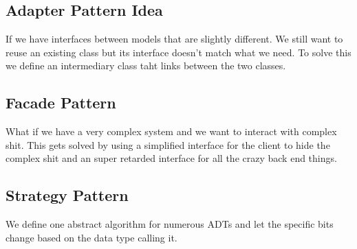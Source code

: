 \documentclass[12pt]{article}
\begin{document}
\subsection{Adapter Pattern Idea}
If we have interfaces between models that are slightly different. We still want to reuse an existing class but its interface doesn't match what we need. To solve this we define an intermediary class taht links between the two classes.

\subsection{Facade Pattern}
What if we have a very complex system and we want to interact with complex shit. This gets solved by using a simplified interface for the client to hide the complex shit and an super retarded interface for all the crazy back end things.

\subsection{Strategy Pattern}
We define one abstract algorithm for numerous ADTs and let the specific bits change based on the data type calling it.
\end{document}
